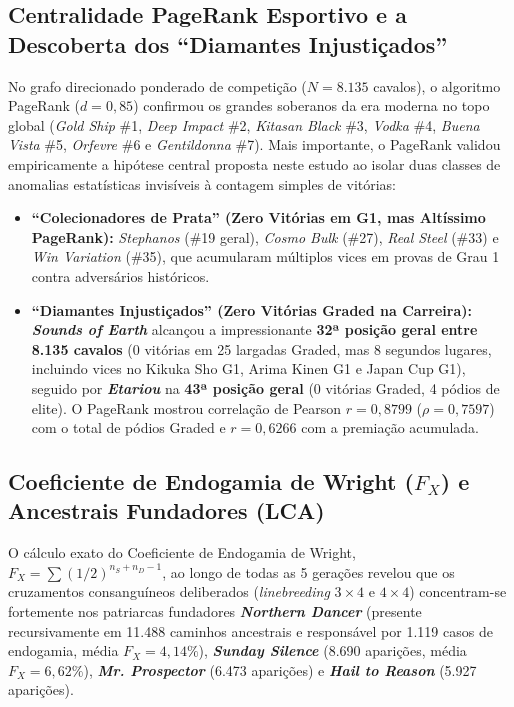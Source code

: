 \documentclass[12pt,a4paper]{article}
\begin{document}
\subsection{Centralidade PageRank Esportivo e a Descoberta dos ``Diamantes Injustiçados''}
No grafo direcionado ponderado de competição ($N = 8.135$ cavalos), o algoritmo PageRank ($d = 0,85$) confirmou os grandes soberanos da era moderna no topo global (\textit{Gold Ship} \#1, \textit{Deep Impact} \#2, \textit{Kitasan Black} \#3, \textit{Vodka} \#4, \textit{Buena Vista} \#5, \textit{Orfevre} \#6 e \textit{Gentildonna} \#7). Mais importante, o PageRank validou empiricamente a hipótese central proposta neste estudo ao isolar duas classes de anomalias estatísticas invisíveis à contagem simples de vitórias:
\begin{itemize}
    \item \textbf{``Colecionadores de Prata'' (Zero Vitórias em G1, mas Altíssimo PageRank):} \textit{Stephanos} (\#19 geral), \textit{Cosmo Bulk} (\#27), \textit{Real Steel} (\#33) e \textit{Win Variation} (\#35), que acumularam múltiplos vices em provas de Grau 1 contra adversários históricos.
    \item \textbf{``Diamantes Injustiçados'' (Zero Vitórias Graded na Carreira):} \textbf{\textit{Sounds of Earth}} alcançou a impressionante \textbf{32ª posição geral entre 8.135 cavalos} (0 vitórias em 25 largadas Graded, mas 8 segundos lugares, incluindo vices no Kikuka Sho G1, Arima Kinen G1 e Japan Cup G1), seguido por \textbf{\textit{Etariou}} na \textbf{43ª posição geral} (0 vitórias Graded, 4 pódios de elite). O PageRank mostrou correlação de Pearson $r = 0,8799$ ($\rho = 0,7597$) com o total de pódios Graded e $r = 0,6266$ com a premiação acumulada.
\end{itemize}

\subsection{Coeficiente de Endogamia de Wright ($F_X$) e Ancestrais Fundadores (LCA)}
O cálculo exato do Coeficiente de Endogamia de Wright, $F_X = \sum (1/2)^{n_S + n_D - 1}$, ao longo de todas as 5 gerações revelou que os cruzamentos consanguíneos deliberados (\textit{linebreeding} $3\times 4$ e $4\times 4$) concentram-se fortemente nos patriarcas fundadores \textbf{\textit{Northern Dancer}} (presente recursivamente em 11.488 caminhos ancestrais e responsável por 1.119 casos de endogamia, média $F_X = 4,14\%$), \textbf{\textit{Sunday Silence}} (8.690 aparições, média $F_X = 6,62\%$), \textbf{\textit{Mr. Prospector}} (6.473 aparições) e \textbf{\textit{Hail to Reason}} (5.927 aparições).
\end{document}

